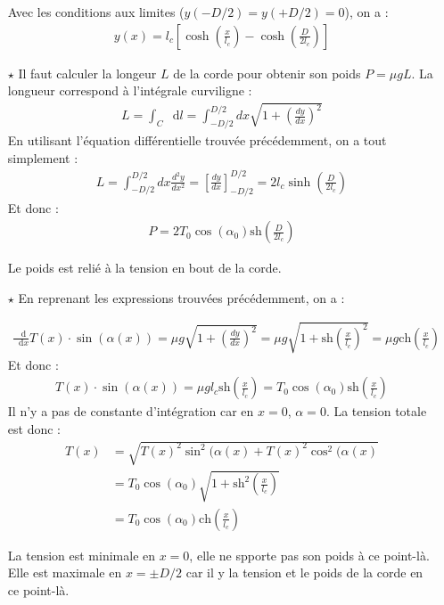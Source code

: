 \documentclass{report}
\newcommand*\dif{\mathop{}\!\mathrm{d}}
\begin{document}
\begin{itemize}
	Avec les conditions aux limites ($y(-D/2)=y(+D/2)=0$), on a :
	\begin{align*}
	y(x)=l_c\left[\cosh\left(\frac{x}{l_c} \right) -\cosh\left(\frac{D}{2l_c} \right) \right] 
	\end{align*}
	
	\item[$\star$] Il faut calculer la longeur $L$ de la corde pour obtenir son poids $P=\mu gL$. La longueur correspond à l'intégrale curviligne :
	\begin{align*}
		L=\int_C \dif l=\int_{-D/2}^{D/2}dx\sqrt{1+\left( \frac{dy}{dx}\right)^2}
	\end{align*}
	En utilisant l'équation différentielle trouvée précédemment, on a tout simplement :
	\begin{align*}
		L=\int_{-D/2}^{D/2}dx\frac{d^2y}{dx^2}=\left[ \frac{dy}{dx}\right]_{-D/2}^{D/2}=2l_c\sinh\left(\frac{D}{2l_c} \right) 
	\end{align*}
	Et donc :
\begin{align*}
		P = 2 T_0 \cos(\alpha_0)\mathrm{sh}\left(\frac{D}{2l_c} \right) 
\end{align*}

Le poids est relié à la tension en bout de la corde. 
	
	\item[$\star$] En reprenant les expressions trouvées précédemment, on a :
	
	\begin{align*}
		\frac{\dif }{\dif x}T(x)\cdot\sin(\alpha(x))=\mu g \sqrt{1+\left( \frac{dy}{dx}\right)^2}= \mu g \sqrt{1+\mathrm{sh}\left( \frac{x}{l_c}\right)^2}=\mu g \mathrm{ch}\left( \frac{x}{l_c}\right)
	\end{align*}
	Et donc :
	\begin{align*}
		T(x)\cdot\sin(\alpha(x)) = \mu g l_c\mathrm{sh}\left( \frac{x}{l_c}\right) = T_0\cos(\alpha_0)\mathrm{sh}\left( \frac{x}{l_c}\right)
	\end{align*}
	Il n'y a pas de constante d'intégration car en $x=0$, $\alpha=0$.
	La tension totale est donc : 
	\begin{align*}
		T(x) &= \sqrt{T(x)^2\sin^2(\alpha(x) + T(x)^2\cos^2(\alpha(x)} \\
		&=T_0\cos(\alpha_0)\sqrt{1+\mathrm{sh^2}\left( \frac{x}{l_c}\right)} \\
		&= T_0\cos(\alpha_0)\mathrm{ch}\left( \frac{x}{l_c}\right)
	\end{align*}
	
La tension est minimale en $x=0$, elle ne spporte pas son poids à ce point-là. Elle est maximale en $x=\pm D/2$ car il y la tension et le poids de la corde en ce point-là.


\end{itemize}
\end{document}
